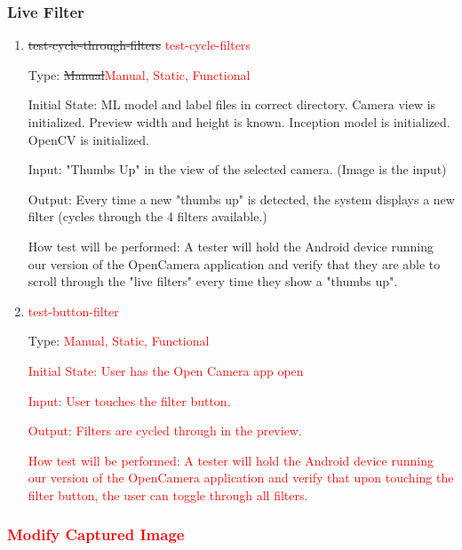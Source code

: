 \documentclass[12pt, titlepage]{article}
\begin{document}
\subsubsection{Live Filter}

\begin{enumerate}

\item{\sout{test-cycle-through-filters}\textcolor{red}{ test-cycle-filters}\\}

Type: \sout{Manual}\textcolor{red}{Manual, Static, Functional}
					
Initial State: 
    ML model and label files in correct directory. Camera view is initialized. Preview width and height is known. Inception model is initialized. OpenCV is initialized. 
					
Input: "Thumbs Up" in the view of the selected camera. (Image is the input)
					
Output: Every time a new "thumbs up" is detected, the system displays a new filter (cycles through the 4 filters available.)
					
How test will be performed: A tester will hold the Android device running our version of the OpenCamera application and verify that they are able to scroll through the "live filters" every time they show a "thumbs up".

\item{\textcolor{red}{ test-button-filter}\\}

Type: \textcolor{red}{Manual, Static, Functional}
					
\textcolor{red}{Initial State: 
    User has the Open Camera app open}
					
\textcolor{red}{Input: User touches the filter button.}
					
\textcolor{red}{Output: Filters are cycled through in the preview.}
					
\textcolor{red}{How test will be performed: A tester will hold the Android device running our version of the OpenCamera application and verify that upon touching the filter button, the user can toggle through all filters.}

\end{enumerate}

\subsubsection{\textcolor{red}{Modify Captured Image}}
\end{document}
